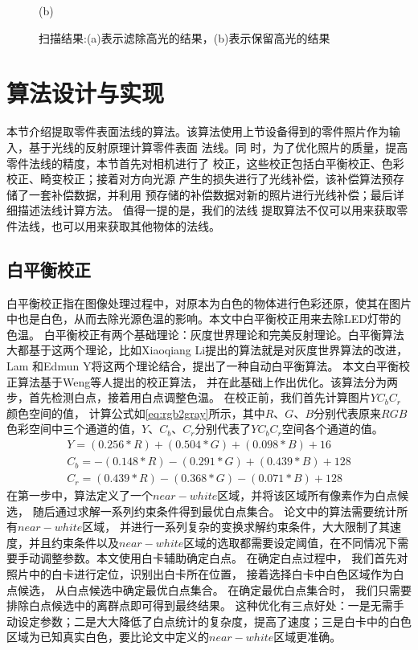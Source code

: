 \begin{figure}[htbp]
\begin{minipage}[]{1.0\linewidth}
	\centerline{
		\footnotesize{(b)}
	}
	\label{caputureb}
	\end{minipage}
\caption{扫描结果:(a)表示滤除高光的结果，(b)表示保留高光的结果}
\label{caputure}
\vspace{-5pt}
\end{figure}

\section{算法设计与实现}

本节介绍提取零件表面法线的算法。该算法使用上节设备得到的零件照片作为输入，基于光线的反射原理计算零件表面
法线。同
时，为了优化照片的质量，提高零件法线的精度，本节首先对相机进行了
校正，这些校正包括白平衡校正、色彩校正、畸变校正；接着对方向光源
产生的损失进行了光线补偿，该补偿算法预存储了一套补偿数据，并利用
预存储的补偿数据对新的照片进行光线补偿；最后详细描述法线计算方法。
值得一提的是，我们的法线
提取算法不仅可以用来获取零件法线，也可以用来获取其他物体的法线。

\subsection{白平衡校正}

白平衡校正指在图像处理过程中，对原本为白色的物体进行色彩还原，使其在图片中也是白色，从而去除光源色温的影响。本文中白平衡校正用来去除LED灯带的色温。
白平衡校正有两个基础理论：灰度世界理论和完美反射理论。白平衡算法大都基于这两个理论，比如Xiaoqiang Li\cite{10.1007/978-3-642-37149-3_38}提出的算法就是对灰度世界算法的改进，Lam 和Edmun Y\cite{lam2005combining}将这两个理论结合，提出了一种自动白平衡算法。
本文白平衡校正算法基于Weng\cite{weng2005novel}等人提出的校正算法，
并在此基础上作出优化。该算法分为两步，首先检测白点，接着用白点调整色温。
在校正前，我们首先计算图片$YC_b C_r$颜色空间的值，
计算公式如\eqref{eq:rgb2gray}所示，其中$R$、$G$、$B$分别代表原来$RGB$
色彩空间中三个通道的值，$Y$、$C_b$、$C_r$分别代表了$YC_b C_r$空间各个通道的值。
\begin{equation}\label{eq:rgb2gray}
\begin{split}
Y=(0.256\ast R)+ (0.504\ast G)+(0.098\ast B)+16\\
C_b=-(0.148\ast R)-(0.291\ast G)+(0.439\ast B)+128\\
C_r=(0.439\ast R)-(0.368\ast G)-(0.071\ast B)+128
\end{split}
\end{equation}
在第一步中，算法定义了一个$near-white$区域，并将该区域所有像素作为白点候选，
随后通过求解一系列约束条件得到最优白点集合。
论文中的算法需要统计所有$near-white$区域，
并进行一系列复杂的变换求解约束条件，大大限制了其速度，并且约束条件以及$near-white$区域的选取都需要设定阈值，在不同情况下需要手动调整参数。本文使用白卡辅助确定白点。
在确定白点过程中，
我们首先对照片中的白卡进行定位，识别出白卡所在位置，
接着选择白卡中白色区域作为白点候选，
从白点候选中确定最优白点集合。
在确定最优白点集合时，
我们只需要排除白点候选中的离群点即可得到最终结果。
这种优化有三点好处：一是无需手动设定参数；二是大大降低了白点统计的复杂度，提高了速度；三是白卡中的白色区域为已知真实白色，要比论文中定义的$near-white$区域更准确。

